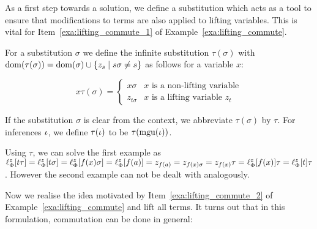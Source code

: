 As a first step towards a solution, we define a substitution which acts as a tool to ensure that modifications to terms are also applied to lifting variables.
This is vital for Item~\ref{exa:lifting_commute_1} of Example~\ref{exa:lifting_commute}.

\begin{defi}[$\tau$]
	For a substitution $\sigma$ we define the infinite substitution $\tau(\sigma)$ with $\operatorname{dom}(\tau(\sigma)) = \operatorname{dom}(\sigma) \cup \{z_s \mid s\sigma \neq s\}$ as follows for a variable $x$:

	\[
		x\tau(\sigma) =
		\begin{cases}
			x\sigma & \text{$x$ is a non-lifting variable} \\
			z_{t\sigma} & \text{$x$ is a lifting variable $z_t$}
		\end{cases} 
	\]

	If the substitution $\sigma$ is clear from the context, we abbreviate $\tau(\sigma)$ by $\tau$. 
	For inferences $\iota$, we define $\tau(\iota)$ to be $\tau(\operatorname{mgu}(\iota))$.
\end{defi}

\addtocounter{exa}{-2}
\begin{exa}[continued]
	Using $\tau$, we can solve the first example as $\ell_{\Phi}^{z}[t\tau] = \ell_{\Phi}^{z}[t\sigma] = \ell_{\Phi}^{z}[f(x)\sigma] = \ell_{\Phi}^{z}[f(a)] = z_{f(a)} = z_{f(x)\sigma} = z_{f(x)} \tau = \ell_{\Phi}^{z}[f(x)]\tau = \ell_{\Phi}^{z}[t]\tau$.
	However the second example can not be dealt with analogously.
\end{exa}
\addtocounter{exa}{1}

Now we realise the idea motivated by Item~\ref{exa:lifting_commute_2} of Example~\ref{exa:lifting_commute} and lift all terms.
It turns out that in this formulation, commutation can be done in general:


